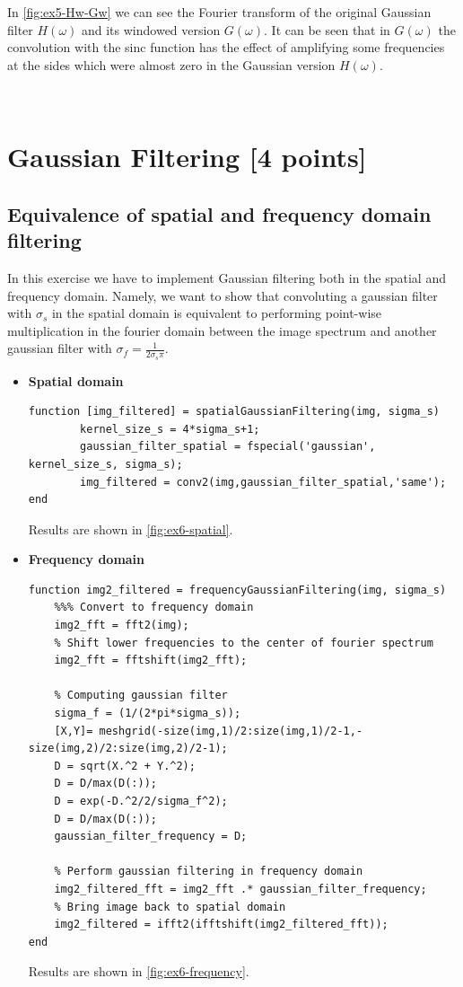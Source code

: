 \documentclass[tikz,14pt,fleqn]{article}
\begin{document}
In \autoref{fig:ex5-Hw-Gw} we can see the Fourier transform of the original Gaussian filter $H(\omega)$ and its windowed version $G(\omega)$. It can be seen that in $G(\omega)$ the convolution with the sinc function has the effect of amplifying some frequencies at the sides which were almost zero in the Gaussian version $H(\omega)$.

\clearpage 
\section{Gaussian Filtering [4 points]}
\subsection{Equivalence of spatial and frequency domain filtering}
In this exercise we have to implement Gaussian filtering both in the spatial and frequency domain. Namely, we want to show that convoluting a gaussian filter with $\sigma_s$ in the spatial domain is equivalent to performing point-wise multiplication in the fourier domain between the image spectrum and another gaussian filter with $\sigma_f = \frac{1}{2\sigma_s \pi}$.
\begin{itemize}
    \item \textbf{Spatial domain}
\begin{verbatim} 
function [img_filtered] = spatialGaussianFiltering(img, sigma_s)
        kernel_size_s = 4*sigma_s+1;
        gaussian_filter_spatial = fspecial('gaussian', kernel_size_s, sigma_s);
        img_filtered = conv2(img,gaussian_filter_spatial,'same');
end
\end{verbatim}
Results are shown in \autoref{fig:ex6-spatial}.
    \item \textbf{Frequency domain}
\begin{verbatim} 
function img2_filtered = frequencyGaussianFiltering(img, sigma_s)
    %%% Convert to frequency domain
    img2_fft = fft2(img);
    % Shift lower frequencies to the center of fourier spectrum
    img2_fft = fftshift(img2_fft);

    % Computing gaussian filter
    sigma_f = (1/(2*pi*sigma_s));
    [X,Y]= meshgrid(-size(img,1)/2:size(img,1)/2-1,-size(img,2)/2:size(img,2)/2-1);
    D = sqrt(X.^2 + Y.^2);
    D = D/max(D(:));
    D = exp(-D.^2/2/sigma_f^2);
    D = D/max(D(:));
    gaussian_filter_frequency = D;

    % Perform gaussian filtering in frequency domain
    img2_filtered_fft = img2_fft .* gaussian_filter_frequency;
    % Bring image back to spatial domain
    img2_filtered = ifft2(ifftshift(img2_filtered_fft));
end
\end{verbatim}
Results are shown in \autoref{fig:ex6-frequency}.
\end{itemize}
\end{document}
